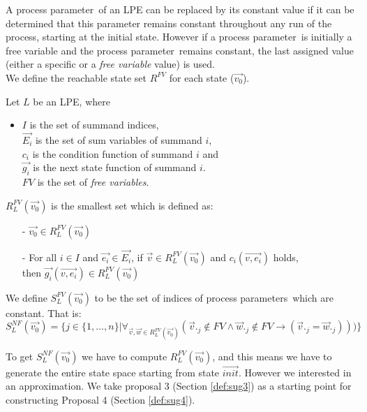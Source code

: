 \index{}\documentclass[a4paper,10pt]{article}
\theoremstyle{plain}
\theoremstyle{definition}
\newcommand{\ovr}{\overrightarrow}
\newcommand{\pp}{process parameter}
\newcommand{\pps}{process parameters}
\newcommand{\ti}{\textit}
\begin{document}
A \pp\ of an LPE can be replaced by its constant value if it can be determined that this parameter remains constant throughout any run of the process, starting at the initial state. However if a \pp\ is initially a free variable and the \pp\ remains constant, the last assigned value (either a specific or a \ti{free variable} value) is used.\\

We define the reachable state set $R^{FV}$ for each state ($\ovr{v_0}$). 
\begin{defn}\label{def:lpe} Let $L$ be an LPE, where\begin{itemize}
\item $I$ is the set of summand indices, \\ $\ovr{E_i}$ is the set of sum variables of summand $i$, \\ $c_i$ is the condition function of summand $i$ and \\ $\ovr{g_i}$ is the next state function of summand $i$. \\
$FV$ is the set of \ti{free variables}.\\
\end{itemize}

$R_L^{FV}(\ovr{v_0})$ is the smallest set which is defined as:
  \begin{itemize}
    \item[-] $\ovr{v_0} \in R_L^{FV}(\ovr{v_0})$
    \item[-] For all $i \in I$ and $\ovr{e_i} \in \ovr{E_i}$, if $\ovr{v} \in R_L^{FV}(\ovr{v_0})$ and $c_i(\ovr{v, e_i})$ holds, \\ then $\ovr{g_i}(\ovr{v, e_i}) \in R_L^{FV}(\ovr{v_0})$ \\
   \end{itemize}
\end{defn}

\begin{defn}\label{def:lpe_comp_fv} We define $S_L^{FV}(\ovr{v_0})$ to be the set of indices of \pps\ which are constant. That is:\\

$S_L^{NF}(\ovr{v_0}) = \lbrace j \in  \lbrace 1, \ldots, n \rbrace \vert \forall_{\ovr{v}, \ovr{w} \in R_L^{FV}(\ovr{v_0})}( \ovr{v}._j \not\in FV \wedge \ovr{w}._j \not\in FV \rightarrow ( \ovr{v}._j = \ovr{w}._j)))
\rbrace $
\end{defn}

To get $S_L^{NF} (\ovr{v_0})$ we have to compute $R_L^{FV}(\ovr{v_0})$, and this means we have to generate the entire state space starting from state $\ovr{init}$. However we interested in an approximation. We take proposal 3 (Section \ref{def:sug3}) as a starting point for constructing Proposal 4 (Section \ref{def:sug4}).
\end{document}
